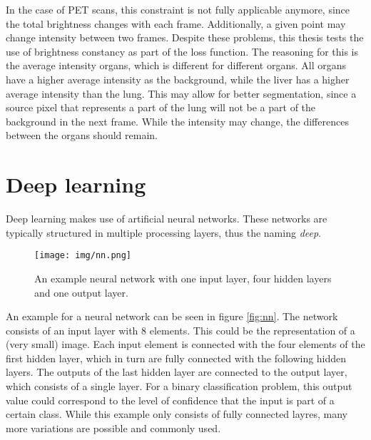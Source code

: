In the case of PET scans, this constraint is not fully applicable anymore, since the total brightness changes with each frame. Additionally,  a given point may change intensity between two frames.
Despite these problems, this thesis tests the use of brightness constancy as  part of the loss function. The reasoning for this is the average intensity organs, which is different for different organs.  All organs have a higher average intensity as the background, while the liver has a higher average intensity than the lung. This may allow for better segmentation, since a source pixel that represents a part of the lung will not be a part of the background in the next frame. While the intensity may change, the differences between the organs should remain.

\section{Deep learning}
\label{s:deeplearning}
Deep learning makes use of artificial neural networks. These networks are typically structured in multiple processing layers, thus the naming \emph{deep}.
\begin{figure}
	\centering
	\texttt{[image: img/nn.png]}
	\caption{An example neural network with one input layer, four hidden layers and one output layer.}
	\label{fig:nn}
\end{figure}
An example for a neural network can be seen in figure \eqref{fig:nn}. The network consists of an input layer with 8 elements. This could be the representation of a (very small) image. Each input element is connected with the four elements of the first hidden layer, which in turn are fully connected with the following hidden layers. The outputs of the last hidden layer are connected to the output layer, which consists of a single layer. For a binary classification problem, this output value could correspond to the level of confidence that the input is part of a certain class. While this example only consists of fully connected layres, many more variations are possible and commonly used.

